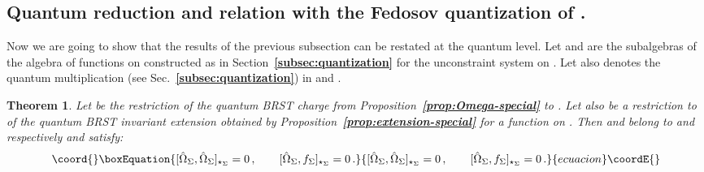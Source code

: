 \documentclass[a4paper,11pt]{amsart}
\newtheorem{thm}{Theorem}
\numberwithin{thm}{section} %
\numberwithin{equation}{section} %
\numberwithin{figure}{section} %
\providecommand{\bref}[1]{{\bf \ref{#1}}}
\providecommand{\commut}[2]{[#1,#2]}
\renewcommand{\:}{{\rm\, :\,}}
\def\manM{{\mathcal M}}
\def\qA{{\hat{\mathfrak A}}}
\def\E{{ \mathcal E}}
\begin{document}
\subsection{Quantum reduction and relation with the Fedosov
quantization of \myHighlight{$\Sigma$}\coordHE{}.}  Now we are going to show that
the results of the previous subsection can be restated at the quantum
level.  Let \myHighlight{$\qA^\Sigma$}\coordHE{} and \myHighlight{$\qA^\Sigma_0$}\coordHE{} are
the subalgebras of the algebra of functions on \myHighlight{$\E_\Sigma$}\coordHE{}
constructed as in Section~\bref{subsec:quantization} for the unconstraint system
on \myHighlight{$\Sigma$}\coordHE{}.  Let also \myHighlight{$\star_\Sigma$}\coordHE{} denotes the
quantum multiplication (see Sec.~\bref{subsec:quantization}) in
\myHighlight{$\qA^\Sigma$}\coordHE{} and \myHighlight{$\qA^\Sigma_0$}\coordHE{}.
\begin{thm}
Let \myHighlight{${\hat\Omega}_\Sigma$}\coordHE{} be the restriction of the
quantum BRST charge \coordHE{} from
Proposition~\bref{prop:Omega-special} to \myHighlight{$\E_\Sigma$}\coordHE{}. Let also \coordHE{} be
a restriction to \myHighlight{$\E_\Sigma$}\coordHE{} of the quantum BRST invariant
extension \coordHE{} obtained by Proposition~\bref{prop:extension-special}
for a function \coordHE{} on \myHighlight{$\manM$}\coordHE{}. Then \myHighlight{${\hat\Omega}_\Sigma$}\coordHE{} and
\coordHE{} belong to \myHighlight{$\qA^\Sigma$}\coordHE{} and \myHighlight{$\qA^\Sigma_0$}\coordHE{} respectively
and satisfy:
\begin{equation}\coord{}\boxEquation{
  \commut{{\hat\Omega}_\Sigma}{{\hat\Omega}_\Sigma}_{\star_\Sigma}=0\,,
\qquad  
  \commut{{\hat\Omega}_\Sigma}{f_\Sigma}_{\star_\Sigma}=0\,.
}{
  \commut{{\hat\Omega}_\Sigma}{{\hat\Omega}_\Sigma}_{\star_\Sigma}=0\,,
\qquad  
  \commut{{\hat\Omega}_\Sigma}{f_\Sigma}_{\star_\Sigma}=0\,.
}{ecuacion}\coordE{}\end{equation}
\end{thm}
\end{document}
